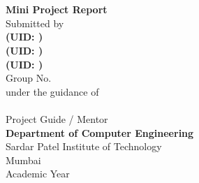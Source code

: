 \thispagestyle{empty}
\begin{center}
\vspace*{1.2cm}
{\Huge\bfseries \ProjectTitle}\\[0.5cm]
{\Large \ProjectSub}\\[1.4cm]
{\LARGE\bfseries Mini Project Report}\\[1.6cm]
{\large Submitted by}\\[0.6cm]
{\large\bfseries \MemberA \quad (UID: \UidA)}\\[0.2cm]
{\large\bfseries \MemberB \quad (UID: \UidB)}\\[0.2cm]
{\large\bfseries \MemberC \quad (UID: \UidC)}\\[1.0cm]
{\large Group No.\ \GroupNo}\\[1.4cm]
{\large under the guidance of}\\[0.4cm]
{\Large\bfseries \Guide}\\[0.1cm]
{\large Project Guide / Mentor}\\[1.8cm]
{\large\bfseries Department of Computer Engineering}\\[0.2cm]
{\large Sardar Patel Institute of Technology}\\[0.2cm]
{\large Mumbai}\\[0.5cm]
{\large Academic Year \AY}
\end{center}
